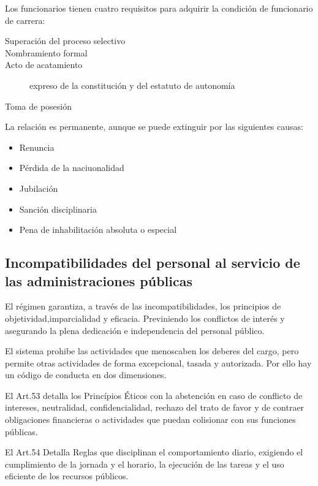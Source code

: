         Los funcionarios tienen cuatro requisitos para adquirir la condición de funcionario de carrera:
        \begin{description}
            \item[Superación del proceso selectivo]
            \item[Nombramiento formal]
            \item[Acto de acatamiento] expreso de la constitución y del estatuto de autonomía
            \item[Toma de posesión]
        \end{description}

        La relación es permanente, aunque se puede extinguir por las siguientes causas:
        \begin{itemize}
            \item Renuncia
            \item Pérdida de la naciuonalidad
            \item Jubilación
            \item Sanción disciplinaria
            \item Pena de inhabilitación absoluta o especial
        \end{itemize}

\subsection{Incompatibilidades del personal al servicio de las administraciones públicas} %
        El régimen garantiza, a través de las incompatibilidades, los principios de objetividad,imparcialidad y eficacia. Previniendo los conflictos de interés y asegurando la plena dedicación e independencia del personal público.

        El sistema prohibe las actividades que menoscaben los deberes del cargo, pero permite otras actividades de forma excepcional, tasada y autorizada. Por ello hay un código de conducta en dos dimensiones.
        
        El Art.53 detalla los Princípios Éticos con la abstención en caso de conflicto de intereses, neutralidad, confidencialidad, rechazo del trato de favor y de contraer obligaciones financieras o actividades que puedan colisionar con sus funciones públicas.

        El Art.54 Detalla Reglas que disciplinan el comportamiento diario, exigiendo el cumplimiento de la jornada y el horario, la ejecución de las tareas y el uso eficiente de los recursos públicos.



